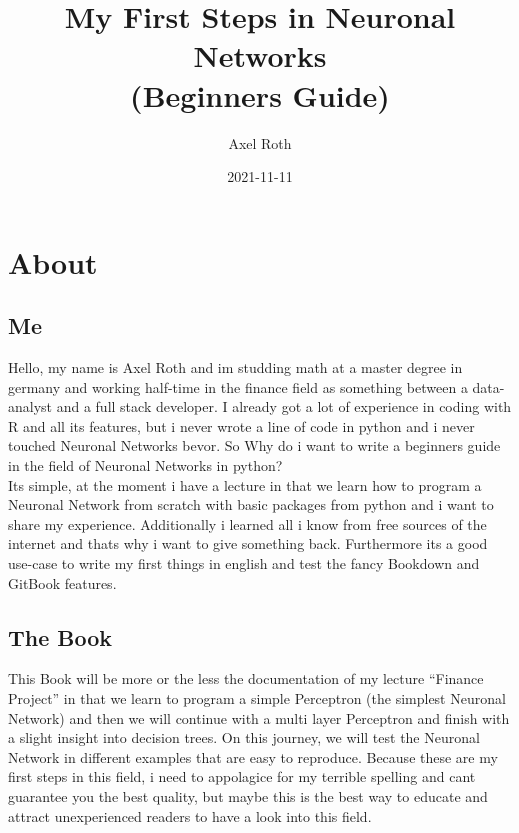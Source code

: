\documentclass[
]{book}
\title{My First Steps in Neuronal Networks\\
(Beginners Guide)}
\author{Axel Roth}
\date{2021-11-11}
\begin{document}
\maketitle

{
\setcounter{tocdepth}{1}
\tableofcontents
}
\hypertarget{about}{%
\chapter{About}\label{about}}

\hypertarget{me}{%
\section{Me}\label{me}}

Hello, my name is Axel Roth and im studding math at a master degree in germany and working half-time in the finance field as something between a data-analyst and a full stack developer. I already got a lot of experience in coding with R and all its features, but i never wrote a line of code in python and i never touched Neuronal Networks bevor. So Why do i want to write a beginners guide in the field of Neuronal Networks in python?\\
Its simple, at the moment i have a lecture in that we learn how to program a Neuronal Network from scratch with basic packages from python and i want to share my experience. Additionally i learned all i know from free sources of the internet and thats why i want to give something back. Furthermore its a good use-case to write my first things in english and test the fancy Bookdown and GitBook features.

\hypertarget{the-book}{%
\section{The Book}\label{the-book}}

This Book will be more or the less the documentation of my lecture ``Finance Project'' in that we learn to program a simple Perceptron (the simplest Neuronal Network) and then we will continue with a multi layer Perceptron and finish with a slight insight into decision trees. On this journey, we will test the Neuronal Network in different examples that are easy to reproduce. Because these are my first steps in this field, i need to appolagice for my terrible spelling and cant guarantee you the best quality, but maybe this is the best way to educate and attract unexperienced readers to have a look into this field.
\end{document}
